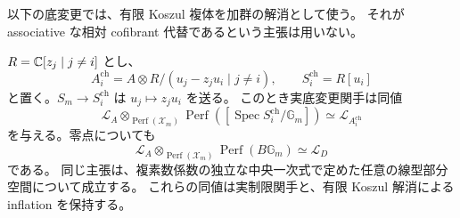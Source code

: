 以下の底変更では、有限 Koszul 複体を加群の解消として使う。
それが associative な相対 cofibrant 代替であるという主張は用いない。

\begin{lemma}[中央線型商の線束圏との同定]
\label{mbl:lem:central-base-change}
$R=\mathbb C[z_j\mid j\ne i]$ とし、
\[
 A_i^{\mathrm{ch}}
   =A\otimes R/(u_j-z_ju_i\mid j\ne i),\qquad
 S_i^{\mathrm{ch}}=R[u_i]
\]
と置く。$S_m\to S_i^{\mathrm{ch}}$ は $u_j\mapsto z_ju_i$ を送る。
このとき実底変更関手は同値
\begin{equation}\label{mbl:eq:chart-base-change}
 \mathcal L_A\otimes_{\operatorname{Perf}(\mathscr X_m)}
 \operatorname{Perf}([\operatorname{Spec}S_i^{\mathrm{ch}}/\mathbb G_m])
       \simeq\mathcal L_{A_i^{\mathrm{ch}}}
\end{equation}
を与える。零点についても
\begin{equation}\label{mbl:eq:center-base-change}
 \mathcal L_A\otimes_{\operatorname{Perf}(\mathscr X_m)}
             \operatorname{Perf}(B\mathbb G_m)
       \simeq\mathcal L_D
\end{equation}
である。
同じ主張は、複素数係数の独立な中央一次式で定めた任意の線型部分空間について成立する。
これらの同値は実制限関手と、有限 Koszul 解消による inflation を保持する。
\end{lemma}

